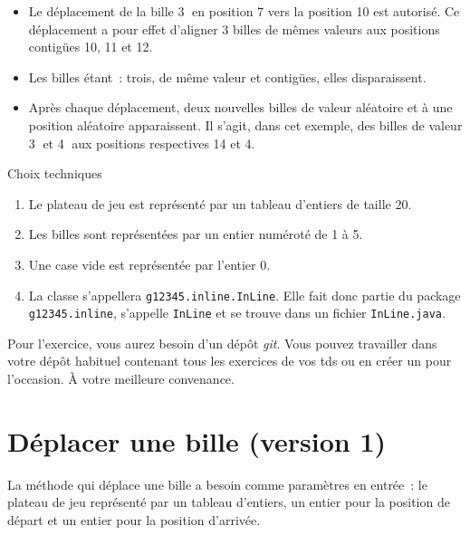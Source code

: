 \documentclass[a4paper,11pt]{style-esi/td}
\begin{document}
\begin{itemize}

	\item Le déplacement de la bille \textcircled{\tiny 3} en position 7 vers
		la position 10 est autorisé. Ce déplacement a pour effet d'aligner
		3 billes de mêmes valeurs aux positions contigües 10, 11 et 12.  

	\item Les billes étant : trois, de même valeur et contigües, elles 
		disparaissent. 

	\item Après chaque déplacement, deux nouvelles billes de valeur aléatoire
		et à une position aléatoire apparaissent. Il s'agit, dans cet exemple,
		des billes de valeur \textcircled{\tiny 3} et \textcircled{\tiny 4} aux
		positions respectives 14 et 4.  

\end{itemize}



\begin{infoit}{Choix techniques}
	\begin{enumerate}
		\item Le plateau de jeu est représenté par un tableau d'entiers de 
			taille 20. 
		\item Les billes sont représentées par un entier numéroté de 1 à 5. 
		\item Une case vide est représentée par l'entier 0. 
		\item La classe s'appellera \texttt{g12345.inline.InLine}. Elle fait donc
			partie du package \texttt{g12345.inline}, s'appelle \texttt{InLine} et 
			se trouve dans un fichier \texttt{InLine.java}. 
	\end{enumerate}
\end{infoit}


\bigskip
\begin{infobox}
	Pour l'exercice, vous aurez besoin d'un dépôt \textit{git}. Vous pouvez
	travailler dans votre dépôt habituel contenant tous les exercices de vos
	tds ou en créer un pour l'occasion. À votre meilleure convenance. 
\end{infobox}

\bigskip


\section{Déplacer une bille (version 1)}

La méthode  qui déplace une bille a besoin comme paramètres en
entrée~: le plateau de jeu représenté par un tableau d'entiers, un entier pour
la position de départ et un entier pour la position d'arrivée. 
\end{document}
